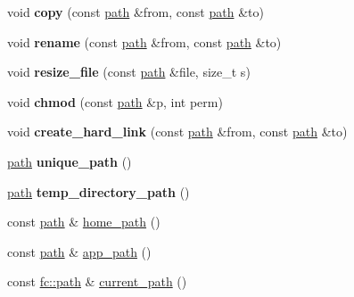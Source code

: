 \begin{DoxyCompactItemize}
\mbox{\label{namespacefc_a79771837fffd80fcc4bc658ee2fc4b2b}} 
void {\bfseries copy} (const \mbox{\hyperlink{classfc_1_1path}{path}} \&from, const \mbox{\hyperlink{classfc_1_1path}{path}} \&to)
\item 
\mbox{\label{namespacefc_a067b275100894b82b6cf3aa85e804ea5}} 
void {\bfseries rename} (const \mbox{\hyperlink{classfc_1_1path}{path}} \&from, const \mbox{\hyperlink{classfc_1_1path}{path}} \&to)
\item 
\mbox{\label{namespacefc_ab25ea24552f2c490047c335a102f12fc}} 
void {\bfseries resize\+\_\+file} (const \mbox{\hyperlink{classfc_1_1path}{path}} \&file, size\+\_\+t s)
\item 
\mbox{\label{namespacefc_ad02fa8571ca999725dfcaa871b672230}} 
void {\bfseries chmod} (const \mbox{\hyperlink{classfc_1_1path}{path}} \&p, int perm)
\item 
\mbox{\label{namespacefc_a9bc83475f555620274c3b776ea38af2b}} 
void {\bfseries create\+\_\+hard\+\_\+link} (const \mbox{\hyperlink{classfc_1_1path}{path}} \&from, const \mbox{\hyperlink{classfc_1_1path}{path}} \&to)
\item 
\mbox{\label{namespacefc_a887060cd05d29b1ed9dec83ec97ee8e5}} 
\mbox{\hyperlink{classfc_1_1path}{path}} {\bfseries unique\+\_\+path} ()
\item 
\mbox{\label{namespacefc_afe3ee0e7b733d87469a967ac456302dc}} 
\mbox{\hyperlink{classfc_1_1path}{path}} {\bfseries temp\+\_\+directory\+\_\+path} ()
\item 
const \mbox{\hyperlink{classfc_1_1path}{path}} \& \mbox{\hyperlink{namespacefc_a638386a755d79377ef4c5c779c731e43}{home\+\_\+path}} ()
\item 
const \mbox{\hyperlink{classfc_1_1path}{path}} \& \mbox{\hyperlink{namespacefc_a3e2cb20721f4d3404ec07ff31694153e}{app\+\_\+path}} ()
\item 
const \mbox{\hyperlink{classfc_1_1path}{fc\+::path}} \& \mbox{\hyperlink{namespacefc_a6e83f7c8488e348511224442f4591d33}{current\+\_\+path}} ()
\item 
\mbox{\label{namespacefc_ab3f1824164e169cf6697c22db22e1065}} 

\end{DoxyCompactItemize}
